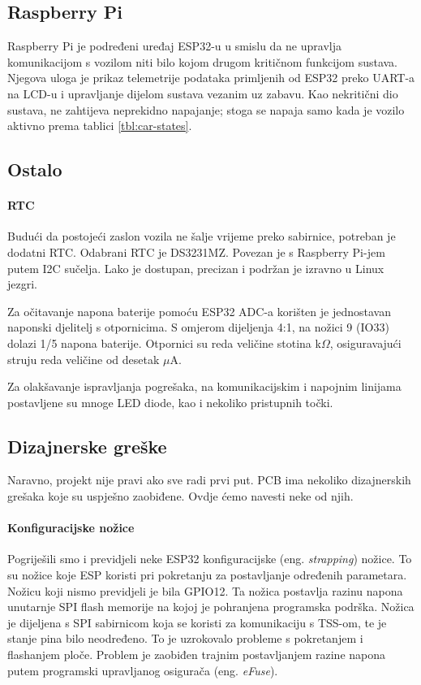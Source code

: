 \subsection{Raspberry Pi}

Raspberry Pi je podređeni uređaj ESP32-u u smislu da ne upravlja komunikacijom s vozilom niti bilo kojom drugom kritičnom funkcijom sustava. 
Njegova uloga je prikaz telemetrije podataka primljenih od ESP32 preko UART-a na LCD-u i upravljanje dijelom sustava vezanim uz zabavu. 
Kao nekritični dio sustava, ne zahtijeva neprekidno napajanje; stoga se napaja samo kada je vozilo aktivno prema tablici \ref{tbl:car-states}.

\subsection{Ostalo}

\paragraph{RTC}

Budući da postojeći zaslon vozila ne šalje vrijeme preko sabirnice, potreban je dodatni RTC. 
Odabrani RTC je DS3231MZ. Povezan je s Raspberry Pi-jem putem I2C sučelja. Lako je dostupan, precizan i podržan je izravno u Linux jezgri.

\bigskip
\noindent
Za očitavanje napona baterije pomoću ESP32 ADC-a korišten je jednostavan naponski djelitelj s otpornicima. 
S omjerom dijeljenja 4:1, na nožici 9 (IO33) dolazi 1/5 napona baterije. 
Otpornici su reda veličine stotina k$\Omega$, osiguravajući struju reda veličine od desetak $\mu$A.

\bigskip
\noindent
Za olakšavanje ispravljanja pogrešaka, na komunikacijskim i napojnim linijama postavljene su mnoge LED diode, kao i nekoliko pristupnih točki.

\subsection{Dizajnerske greške}

Naravno, projekt nije pravi ako sve radi prvi put. PCB ima nekoliko dizajnerskih grešaka koje su uspješno zaobiđene. Ovdje ćemo navesti neke od njih.

\paragraph{Konfiguracijske nožice}
Pogriješili smo i previdjeli neke ESP32 konfiguracijske (eng. \textit{strapping}) nožice. 
To su nožice koje ESP koristi pri pokretanju za postavljanje određenih parametara. 
Nožicu koji nismo previdjeli je bila GPIO12. Ta nožica postavlja razinu napona unutarnje SPI flash memorije na kojoj je pohranjena programska podrška. 
Nožica je dijeljena s SPI sabirnicom koja se koristi za komunikaciju s TSS-om, te je stanje pina bilo neodređeno. 
To je uzrokovalo probleme s pokretanjem i flashanjem ploče. 
Problem je zaobiđen trajnim postavljanjem razine napona putem programski upravljanog osigurača (eng. \textit{eFuse}).

